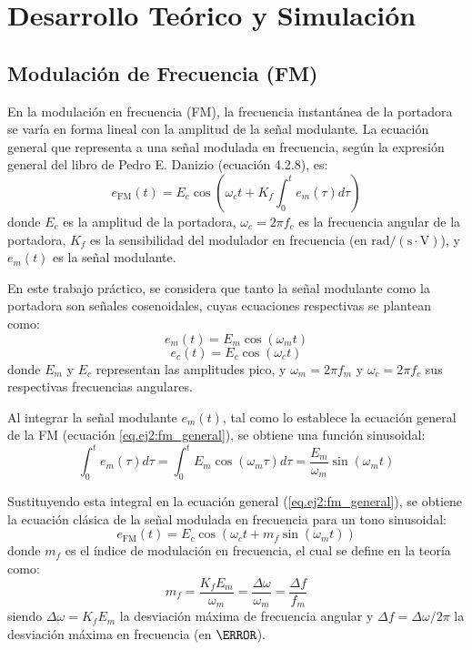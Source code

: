 \chapter{Desarrollo Teórico y Simulación}
\label{sec.ej2:desarrollo}

\section{Modulación de Frecuencia (FM)}
En la modulación en frecuencia (FM), la frecuencia instantánea de la portadora se varía en forma lineal con la
amplitud de la señal modulante. La ecuación general que representa a una señal modulada en frecuencia, según la
expresión general del libro de Pedro E. Danizio (ecuación 4.2.8), es:
\begin{equation}
    e_{\text{FM}}(t) = E_c \cos\left(\omega_c t + K_f \int_0^t e_m(\tau) d\tau\right)
    \label{eq.ej2:fm_general}
\end{equation}
donde $E_c$ es la amplitud de la portadora, $\omega_c = 2\pi f_c$ es la frecuencia angular de la portadora, $K_f$ es
la sensibilidad del modulador en frecuencia (en $\text{rad}/(\text{s}\cdot\text{V})$), y $e_m(t)$ es la señal modulante.

En este trabajo práctico, se considera que tanto la señal modulante como la portadora son señales cosenoidales,
cuyas ecuaciones respectivas se plantean como:
\begin{equation}
    e_m(t) = E_m \cos(\omega_m t)
    \label{eq.ej2:em_cos}
\end{equation}
\begin{equation}
    e_c(t) = E_c \cos(\omega_c t)
    \label{eq.ej2:ec_cos}
\end{equation}
donde $E_m$ y $E_c$ representan las amplitudes pico, y $\omega_m = 2\pi f_m$ y $\omega_c = 2\pi f_c$ sus respectivas
frecuencias angulares.

Al integrar la señal modulante $e_m(t)$, tal como lo establece la ecuación general de la FM (ecuación
\ref{eq.ej2:fm_general}), se obtiene una función sinusoidal:
\begin{equation}
    \int_0^t e_m(\tau) d\tau = \int_0^t E_m \cos(\omega_m \tau) d\tau = \frac{E_m}{\omega_m} \sin(\omega_m t)
    \label{eq.ej2:em_integral}
\end{equation}

Sustituyendo esta integral en la ecuación general (\ref{eq.ej2:fm_general}), se obtiene la ecuación clásica
de la señal modulada en frecuencia para un tono sinusoidal:
\begin{equation}
    e_{\text{FM}}(t) = E_c \cos\left(\omega_c t + m_f \sin(\omega_m t)\right)
    \label{eq.ej2:fm_signal}
\end{equation}
donde $m_f$ es el índice de modulación en frecuencia, el cual se define en la teoría como:
\begin{equation}
    m_f = \frac{K_f E_m}{\omega_m} = \frac{\Delta\omega}{\omega_m} = \frac{\Delta f}{f_m}
    \label{eq.ej2:beta}
\end{equation}
siendo $\Delta\omega = K_f E_m$ la desviación máxima de frecuencia angular y $\Delta f = \Delta\omega / 2\pi$ la
desviación máxima en frecuencia (en $\Hz$).

